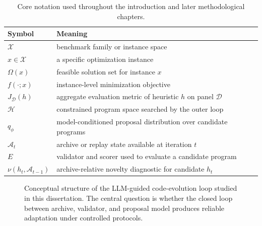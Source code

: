 \begin{table}[t]
\centering
\small
\setlength{\tabcolsep}{3pt}
\begin{tabular}{>{\raggedright\arraybackslash}p{0.95in} >{\raggedright\arraybackslash}p{3.85in}}
\toprule
Symbol & Meaning \\
\midrule
$\mathcal{X}$ & benchmark family or instance space \\
$x \in \mathcal{X}$ & a specific optimization instance \\
$\Omega(x)$ & feasible solution set for instance $x$ \\
$f(\cdot;x)$ & instance-level minimization objective \\
$J_{\mathcal{D}}(h)$ & aggregate evaluation metric of heuristic $h$ on panel $\mathcal{D}$ \\
$\mathcal{H}$ & constrained program space searched by the outer loop \\
$q_{\phi}$ & model-conditioned proposal distribution over candidate programs \\
$\mathcal{A}_t$ & archive or replay state available at iteration $t$ \\
$E$ & validator and scorer used to evaluate a candidate program \\
$\nu(h_t,\mathcal{A}_{t-1})$ & archive-relative novelty diagnostic for candidate $h_t$ \\
\bottomrule
\end{tabular}
\caption[Core notation]{Core notation used throughout the introduction and later methodological chapters.}
\label{tab:intro-notation}
\end{table}

\begin{figure}[t]
\centering
{}
\caption[Conceptual code-evolution loop]{Conceptual structure of the LLM-guided code-evolution loop studied in this dissertation.
The central question is whether the closed loop between archive, validator, and proposal model
produces reliable adaptation under controlled protocols.}
\label{fig:intro-loop}
\end{figure}

